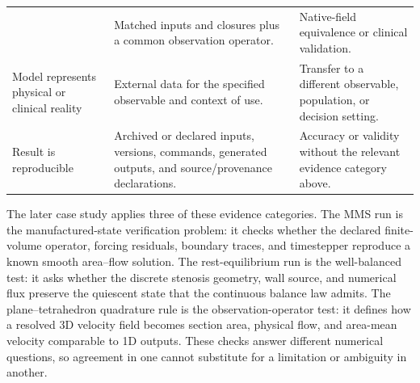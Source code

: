 \begin{table}[!htb]
\begin{tabularx}{\textwidth}{@{}
        >{\raggedright\arraybackslash}p{}
        >{\raggedright\arraybackslash}p{}
        >{\raggedright\arraybackslash}X@{}}
            & Matched inputs and closures plus a common observation operator.
            & Native-field equivalence or clinical validation. \\
        Model represents physical or clinical reality
            & External data for the specified observable and context of use.
            & Transfer to a different observable, population, or decision
            setting. \\
        Result is reproducible
            & Archived or declared inputs, versions, commands, generated outputs,
            and source/provenance declarations.
            & Accuracy or validity without the relevant evidence category above. \\
        \bottomrule
    \end{tabularx}
\end{table}

\begin{stenosisillustration}
The later case study applies three of these evidence categories. The MMS run is
the manufactured-state verification problem: it checks whether the declared
finite-volume operator, forcing residuals, boundary traces, and timestepper
reproduce a known smooth area--flow solution. The rest-equilibrium run is the
well-balanced test: it asks whether the discrete stenosis geometry, wall
source, and numerical flux preserve the quiescent state that the continuous
balance law admits. The plane--tetrahedron quadrature rule is the
observation-operator test: it defines how a resolved 3D velocity field becomes
section area, physical flow, and area-mean velocity comparable to 1D outputs.
These checks answer different numerical questions, so agreement in one cannot
substitute for a limitation or ambiguity in another.
\end{stenosisillustration}
